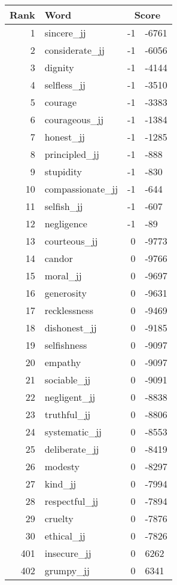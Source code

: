\begin{longtable}[!htbp]{| rlr@{.}l |}
    \hline
    \textbf{Rank} & \textbf{Word} & \multicolumn{2}{c|}{\textbf{Score}} \\
    \hline
    \endhead
    1 & sincere\_jj & -1 & -6761 \\
    2 & considerate\_jj & -1 & -6056 \\
    3 & dignity & -1 & -4144 \\
    4 & selfless\_jj & -1 & -3510 \\
    5 & courage & -1 & -3383 \\
    6 & courageous\_jj & -1 & -1384 \\
    7 & honest\_jj & -1 & -1285 \\
    8 & principled\_jj & -1 & -888 \\
    9 & stupidity & -1 & -830 \\
    10 & compassionate\_jj & -1 & -644 \\
    11 & selfish\_jj & -1 & -607 \\
    12 & negligence & -1 & -89 \\
    13 & courteous\_jj & 0 & -9773 \\
    14 & candor & 0 & -9766 \\
    15 & moral\_jj & 0 & -9697 \\
    16 & generosity & 0 & -9631 \\
    17 & recklessness & 0 & -9469 \\
    18 & dishonest\_jj & 0 & -9185 \\
    19 & selfishness & 0 & -9097 \\
    20 & empathy & 0 & -9097 \\
    21 & sociable\_jj & 0 & -9091 \\
    22 & negligent\_jj & 0 & -8838 \\
    23 & truthful\_jj & 0 & -8806 \\
    24 & systematic\_jj & 0 & -8553 \\
    25 & deliberate\_jj & 0 & -8419 \\
    26 & modesty & 0 & -8297 \\
    27 & kind\_jj & 0 & -7994 \\
    28 & respectful\_jj & 0 & -7894 \\
    29 & cruelty & 0 & -7876 \\
    30 & ethical\_jj & 0 & -7826 \\
    401 & insecure\_jj & 0 & 6262 \\
    402 & grumpy\_jj & 0 & 6341 \\

\end{longtable}
